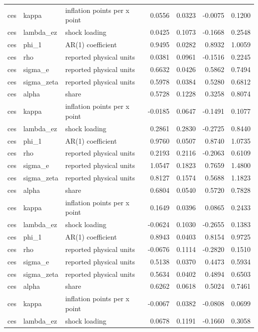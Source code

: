 \begin{tabular}{lllrrrr}
ces & kappa & inflation points per x point & 0.0556 & 0.0323 & -0.0075 & 0.1200 \\
ces & lambda\_ez & shock loading & 0.0425 & 0.1073 & -0.1668 & 0.2548 \\
ces & phi\_1 & AR(1) coefficient & 0.9495 & 0.0282 & 0.8932 & 1.0059 \\
ces & rho & reported physical units & 0.0381 & 0.0961 & -0.1516 & 0.2245 \\
ces & sigma\_e & reported physical units & 0.6632 & 0.0426 & 0.5862 & 0.7494 \\
ces & sigma\_zeta & reported physical units & 0.5978 & 0.0384 & 0.5280 & 0.6812 \\
ces & alpha & share & 0.5728 & 0.1228 & 0.3258 & 0.8074 \\
ces & kappa & inflation points per x point & -0.0185 & 0.0647 & -0.1491 & 0.1077 \\
ces & lambda\_ez & shock loading & 0.2861 & 0.2830 & -0.2725 & 0.8440 \\
ces & phi\_1 & AR(1) coefficient & 0.9760 & 0.0507 & 0.8740 & 1.0735 \\
ces & rho & reported physical units & 0.2193 & 0.2116 & -0.2063 & 0.6109 \\
ces & sigma\_e & reported physical units & 1.0547 & 0.1823 & 0.7659 & 1.4800 \\
ces & sigma\_zeta & reported physical units & 0.8127 & 0.1574 & 0.5688 & 1.1823 \\
ces & alpha & share & 0.6804 & 0.0540 & 0.5720 & 0.7828 \\
ces & kappa & inflation points per x point & 0.1649 & 0.0396 & 0.0865 & 0.2433 \\
ces & lambda\_ez & shock loading & -0.0624 & 0.1030 & -0.2655 & 0.1383 \\
ces & phi\_1 & AR(1) coefficient & 0.8943 & 0.0403 & 0.8154 & 0.9725 \\
ces & rho & reported physical units & -0.0676 & 0.1114 & -0.2820 & 0.1510 \\
ces & sigma\_e & reported physical units & 0.5138 & 0.0370 & 0.4473 & 0.5934 \\
ces & sigma\_zeta & reported physical units & 0.5634 & 0.0402 & 0.4894 & 0.6503 \\
ces & alpha & share & 0.6262 & 0.0618 & 0.5024 & 0.7461 \\
ces & kappa & inflation points per x point & -0.0067 & 0.0382 & -0.0808 & 0.0699 \\
ces & lambda\_ez & shock loading & 0.0678 & 0.1191 & -0.1660 & 0.3058 \\

\end{tabular}

